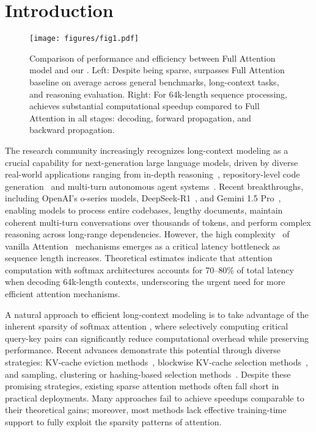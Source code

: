 \section{Introduction}

\begin{figure}[t] 
\centering 
\texttt{[image: figures/fig1.pdf]} 
\caption{Comparison of performance and efficiency between Full Attention model and our \method{}. Left: Despite being sparse, \method{} surpasses Full Attention baseline on average across general benchmarks, long-context tasks, and reasoning evaluation. Right: For 64k-length sequence processing, \method{} achieves substantial computational speedup compared to Full Attention in all stages: decoding, forward propagation, and backward propagation.
}
\label{fig:fig1}
\end{figure}

The research community increasingly recognizes long-context modeling as a crucial capability for next-generation large language models, driven by diverse real-world applications ranging from in-depth reasoning~\citep{star,deepseekr1}, repository-level code generation~\citep{RepoCoder,CodeAgent} and multi-turn autonomous agent systems~\citep{AutoAgent}.
Recent breakthroughs, including OpenAI's o-series models, DeepSeek-R1~\citep{deepseekr1}, and Gemini 1.5 Pro~\citep{team2024gemini}, 
enabling models to process entire codebases, lengthy documents, maintain coherent multi-turn conversations over thousands of tokens, and perform complex reasoning across long-range dependencies.
However, the high complexity~\citep{zaheer2020big} of vanilla Attention~\citep{vaswani2017attention} mechanisms emerges as a critical latency bottleneck as sequence length increases. Theoretical estimates indicate that attention computation with softmax architectures accounts for 70--80\% of total latency when decoding 64k-length contexts, underscoring the urgent need for more efficient attention mechanisms.



A natural approach to efficient long-context modeling is to take advantage of the inherent sparsity of softmax attention \citep{ge2023model, jiang2023llmlingua}, where selectively computing critical query-key pairs can significantly reduce computational overhead while preserving performance. Recent advances demonstrate this potential through diverse strategies: 
KV-cache eviction methods~\citep{h2o,snapkv,zhou2024llm}, blockwise KV-cache selection methods~\citep{quest,infllm,gao2024seerattention}, and sampling, clustering or hashing-based selection methods~\citep{magicpig,clusterkv,desai2024hashattention}.
Despite these promising strategies, existing sparse attention methods often fall short in practical deployments. Many approaches fail to achieve speedups comparable to their theoretical gains; moreover, most methods lack effective training-time support to fully exploit the sparsity patterns of attention.


